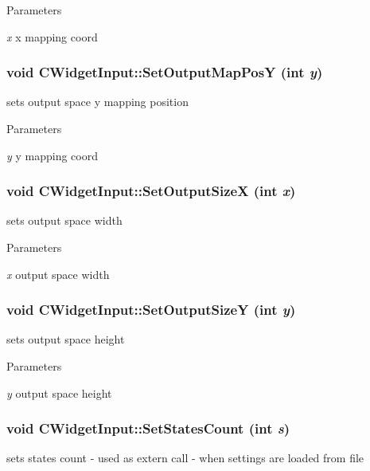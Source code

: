 \begin{DoxyParams}{Parameters}
\item[{\em x}]x mapping coord \end{DoxyParams}
\hypertarget{classCWidgetInput_afdec7dfcd6c8a970fcf0bc62d5b3b723}{
\subsubsection[{SetOutputMapPosY}]{\setlength{\rightskip}{0pt plus 5cm}void CWidgetInput::SetOutputMapPosY (int {\em y})}}
\label{classCWidgetInput_afdec7dfcd6c8a970fcf0bc62d5b3b723}
sets output space y mapping position


\begin{DoxyParams}{Parameters}
\item[{\em y}]y mapping coord \end{DoxyParams}
\hypertarget{classCWidgetInput_a973d6f19d85ece1c17c09c6d3b1a1d46}{
\subsubsection[{SetOutputSizeX}]{\setlength{\rightskip}{0pt plus 5cm}void CWidgetInput::SetOutputSizeX (int {\em x})}}
\label{classCWidgetInput_a973d6f19d85ece1c17c09c6d3b1a1d46}
sets output space width


\begin{DoxyParams}{Parameters}
\item[{\em x}]output space width \end{DoxyParams}
\hypertarget{classCWidgetInput_a45e0226b68c3a47a1ad5f06a6fe6ba37}{
\subsubsection[{SetOutputSizeY}]{\setlength{\rightskip}{0pt plus 5cm}void CWidgetInput::SetOutputSizeY (int {\em y})}}
\label{classCWidgetInput_a45e0226b68c3a47a1ad5f06a6fe6ba37}
sets output space height


\begin{DoxyParams}{Parameters}
\item[{\em y}]output space height \end{DoxyParams}
\hypertarget{classCWidgetInput_ad672ebec4ec33aff45c8d6ffd3cf6c12}{
\subsubsection[{SetStatesCount}]{\setlength{\rightskip}{0pt plus 5cm}void CWidgetInput::SetStatesCount (int {\em s})}}
\label{classCWidgetInput_ad672ebec4ec33aff45c8d6ffd3cf6c12}
sets states count -\/ used as extern call -\/ when settings are loaded from file


